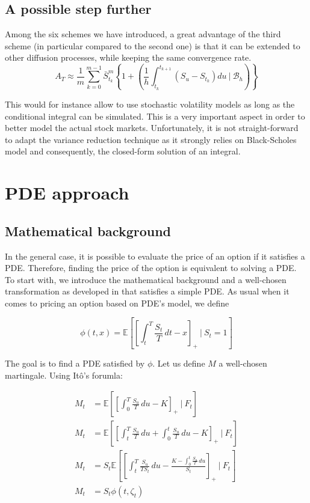 \documentclass{article}
\begin{document}
\subsection{A possible step further}

Among the six schemes we have introduced, a great advantage of the third scheme (in particular compared to the
second one) is that it can be extended to other diffusion processes, while keeping the same convergence rate.
\begin{equation}
    A_T \approx \frac{1}{m} \sum_{k=0}^{m-1}
    	\bar S_{t_k}^m \left\{ 1 +
		\left( \frac{1}{h} \int_{t_k}^{t_{k+1}} \left( S_u - S_{t_k} \right) du \ \Big\vert \ \mathcal B_h \right) \right\} \tag{3+}
\end{equation}

This would for instance allow to use stochastic volatility models as long as the conditional integral can be simulated.
This is a very important aspect in order to better model the actual stock markets.
Unfortunately, it is not straight-forward to adapt the variance reduction technique as it strongly relies on
Black-Scholes model and consequently, the closed-form solution of an integral.

\section{PDE approach}

\subsection{Mathematical background}

In the general case, it is possible to evaluate the price of an option if it satisfies a PDE.
Therefore, finding the price of the option is equivalent to solving a PDE.
To start with, we introduce the mathematical background and a well-chosen transformation as developed 
in \cite{Rogers} that satisfies a simple PDE.
As usual when it comes to pricing an option based on PDE's model, we define

\begin{equation}
	\phi(t,x) = \mathbb E \left[ \left[ \int_{t}^{T} \frac{S_{t}}{T}\,dt-x \right]_{+} \ \big\vert \ S_{t}=1 \right]
	\tag{I}
\end{equation}

The goal is to find a PDE satisfied by $\phi$. Let us define $M$ a well-chosen martingale.
Using It\^o's forumla:

\begin{align*}
        M_{t} &= \mathbb E \left[ \left[ \int_{0}^{T} \frac{S_{u}}{T}\,du-K \right]_{+} \ \Big\vert \ F_{t} \right] \\
        M_{t} &= \mathbb E \left[ \left[ \int_{t}^{T} \frac{S_{u}}{T}\,du+\int_{0}^{t} \frac{S_{u}}{T}\,du-K \right]_{+}
        	 \ \Big\vert \ F_{t} \right]  \\
        M_{t} &= S_{t} \mathbb E \left[ \left[ \int_{t}^{T} \frac{S_{u}}
        {TS_{t}}\,du -\frac{K-\int_{0}^{t} \frac{S_{u}}{T}\,du}{S_{t}} \right]_{+} \ \Big\vert \ F_{t} \right] \\
        M_{t} &= S_{t}\phi(t,\zeta_{t})
\end{align*}
\end{document}

